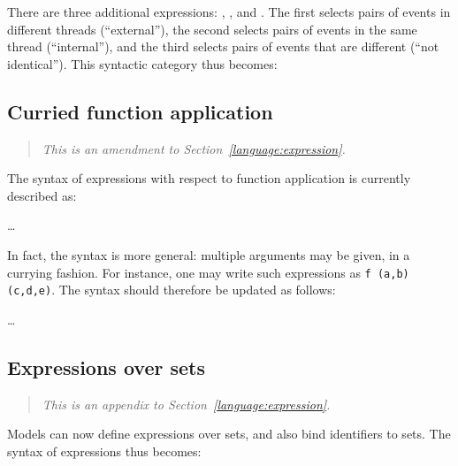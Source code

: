 There are three additional  expressions: , , and . The first selects pairs of events in different threads (``external''), the second selects pairs of events in the same thread (``internal''), and the third selects pairs of events that are different (``not identical''). This syntactic category thus becomes:

\begin{syntax}
 \is
{} \orelse
{} \orelse
{} \orelse
{} \orelse
{} \orelse
{} \orelse
{} \orelse
{} \orelse
{}
\alt
{} \orelse
{} \orelse
{} \orelse
{}
\alt
{} \orelse
{} \orelse
{}
\end{syntax}

\subsection{Curried function application}

\begin{quote}\it 
This is an amendment to Section~\ref{language:expression}.
\end{quote}

The syntax of expressions with respect to function application is currently described as:
\begin{syntax}
 \is{} \dots 
\alt {} \T{(}  \T{)}
\end{syntax}

In fact, the syntax is more general: multiple arguments may be given, in a currying fashion. For instance, one may write such expressions as {\tt f (a,b) (c,d,e)}. The syntax should therefore be updated as follows:
\begin{syntax}
 \is{} \dots 
\alt {} \brepet \T{(}  \T{)} \erepet
\end{syntax}

\subsection{Expressions over sets}

\begin{quote}\it
This is an appendix to Section~\ref{language:expression}.
\end{quote}

Models can now define expressions over sets, and also bind identifiers to sets. The syntax of expressions thus becomes:

